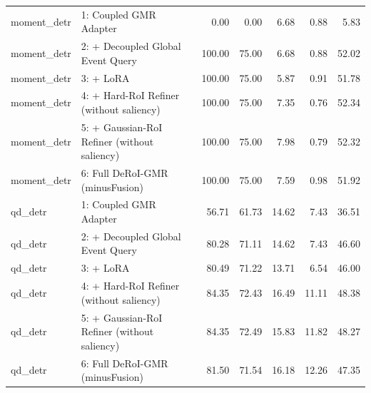 \begin{table}[t]
\begin{tabular}{llrrrrr}
moment\_detr & 1: Coupled GMR Adapter & 0.00 & 0.00 & 6.68 & 0.88 & 5.83 \\
moment\_detr & 2: + Decoupled Global Event Query & 100.00 & 75.00 & 6.68 & 0.88 & 52.02 \\
moment\_detr & 3: + LoRA & 100.00 & 75.00 & 5.87 & 0.91 & 51.78 \\
moment\_detr & 4: + Hard-RoI Refiner (without saliency) & 100.00 & 75.00 & 7.35 & 0.76 & 52.34 \\
moment\_detr & 5: + Gaussian-RoI Refiner (without saliency) & 100.00 & 75.00 & 7.98 & 0.79 & 52.32 \\
moment\_detr & 6: Full DeRoI-GMR (minusFusion) & 100.00 & 75.00 & 7.59 & 0.98 & 51.92 \\
qd\_detr & 1: Coupled GMR Adapter & 56.71 & 61.73 & 14.62 & 7.43 & 36.51 \\
qd\_detr & 2: + Decoupled Global Event Query & 80.28 & 71.11 & 14.62 & 7.43 & 46.60 \\
qd\_detr & 3: + LoRA & 80.49 & 71.22 & 13.71 & 6.54 & 46.00 \\
qd\_detr & 4: + Hard-RoI Refiner (without saliency) & 84.35 & 72.43 & 16.49 & 11.11 & 48.38 \\
qd\_detr & 5: + Gaussian-RoI Refiner (without saliency) & 84.35 & 72.49 & 15.83 & 11.82 & 48.27 \\
qd\_detr & 6: Full DeRoI-GMR (minusFusion) & 81.50 & 71.54 & 16.18 & 12.26 & 47.35 \\
\hline
\end{tabular}
\end{table}
